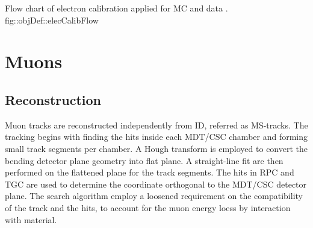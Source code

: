 
{Flow chart of electron calibration applied for MC and data \cite{161_egammaCalibRun1}.}
{fig::objDef::elecCalibFlow}




\clearpage
\section{Muons} \label{sec::objDef::muons}
\subsection{Reconstruction} \label{sec::objDef::muons::reco}
Muon tracks are reconstructed independently from ID, referred as MS-tracks. 
The tracking begins with finding the hits inside each MDT/CSC chamber and forming small track segments per chamber. 
A Hough transform is employed to convert the bending detector plane geometry into flat plane. A straight-line fit are then performed on the flattened plane for the track segments. 
The hits in RPC and TGC are used to determine the coordinate orthogonal to the MDT/CSC detector plane. The search algorithm employ a loosened requirement on the compatibility of the track and the hits, to account for the muon energy loess by interaction with material.\\

